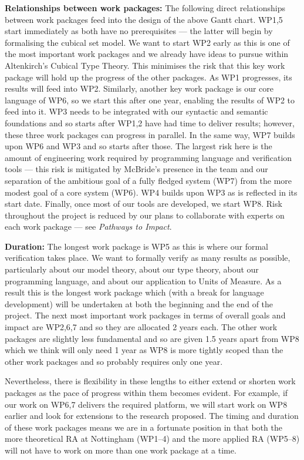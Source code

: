 \documentclass[a4paper,11pt]{article}
\begin{document}
\bigskip

{\bf Relationships between work packages:} The following direct
relationships between work packages feed into the design of the above
Gantt chart. WP1,5 start immediately as both have no prerequisites ---
the latter will begin by formalising the cubical set model. We want to
start WP2 early as this is one of the most important work packages and
we already have ideas to pursue within Altenkirch's Cubical Type
Theory. This minimises the risk that this key work package will hold
up the progress of the other packages. As WP1 progresses, its results
will feed into WP2. Similarly, another key work package is our core
language of WP6, so we start this after one year, enabling the results
of WP2 to feed into it. WP3 needs to be integrated with our syntactic
and semantic foundations and so starts after WP1,2 have had time to
deliver results; however, these three work packages can progress in
parallel. In the same way, WP7 builds upon WP6 and WP3 and so starts
after those. %
The largest risk here is the amount of engineering work required by
programming language and verification tools --- this risk is mitigated
by McBride's presence in the team and our separation of the
ambitious goal of a fully fledged system (WP7) from the more modest
goal of a core system (WP6).  WP4 builds upon WP3 as is reflected in
its start date. Finally, once most of our tools are developed, we
start WP8.  Risk throughout the project is reduced by our plans to
collaborate with experts on each work package --- see {\em Pathways to
  Impact}.


{\bf Duration:} The longest work package is WP5 as this is where our
formal verification takes place. We want to formally verify as many
results as possible, particularly about our model theory, about our
type theory, about our programming language, and about our application
to Units of Measure. As a result this is the longest work package which
(with a break for language development) will be undertaken at both the
beginning and the end of the project. The next most important
work packages in terms of overall goals and impact are WP2,6,7 and so
they are allocated 2 years each. The other work packages are slightly
less fundamental and so are given 1.5 years apart from WP8 which we think
will only need 1 year as WP8 is more tightly scoped than the other
work packages and so probably requires only one year.

Nevertheless, there is flexibility in these lengths to either extend
or shorten work packages as the pace of progress within them becomes
evident. For example, if our work on WP6,7 delivers the required
platform, we will start work on WP8 earlier and look for extensions
to the research proposed. The timing and duration of these work
packages means we are in a fortunate position in that both the more
theoretical RA at Nottingham (WP1--4) and the more applied RA (WP5--8)
will not have to work on more than one work package at a time.
\end{document}

